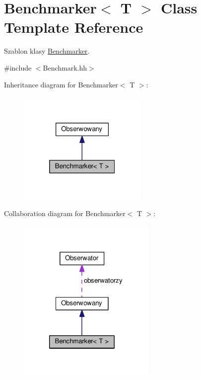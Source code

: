 \hypertarget{a00009}{}\section{Benchmarker$<$ T $>$ Class Template Reference}
\label{a00009}


Szablon klasy \hyperlink{a00009}{Benchmarker}.  




{\ttfamily \#include $<$Benchmark.\+hh$>$}



Inheritance diagram for Benchmarker$<$ T $>$\+:
\nopagebreak
\begin{figure}[H]
\begin{center}
\leavevmode
\includegraphics[width=176pt]{a00125}
\end{center}
\end{figure}


Collaboration diagram for Benchmarker$<$ T $>$\+:
\nopagebreak
\begin{figure}[H]
\begin{center}
\leavevmode
\includegraphics[width=190pt]{a00126}
\end{center}
\end{figure}
